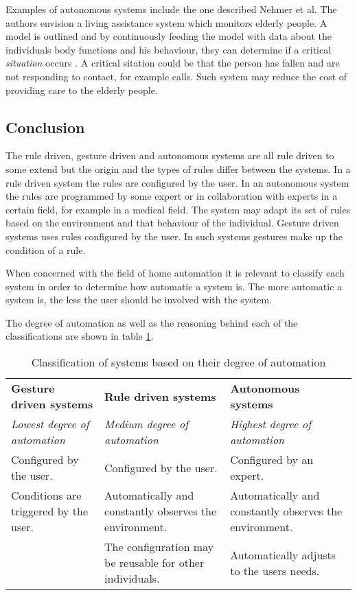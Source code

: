 Examples of autonomous systems include the one described Nehmer et al. The authors envision a living assistance system which monitors elderly people. A model is outlined and by continuously feeding the model with data about the individuals body functions and his behaviour, they can determine if a critical \textit{situation} occurs \cite{nehmer2006living}. A critical sitation could be that the person has fallen and are not responding to contact, for example calls.
Such system may reduce the cost of providing care to the elderly people.

\subsection{Conclusion}

The rule driven, gesture driven and autonomous systems are all rule driven to some extend but the origin and the types of rules differ between the systems. In a rule driven system the rules are configured by the user.
In an autonomous system the rules are programmed by some expert or in collaboration with experts in a certain field, for example in a medical field. The system may adapt its set of rules based on the environment and that behaviour of the individual.
Gesture driven systems uses rules configured by the user. In such systems gestures make up the condition of a rule.

When concerned with the field of home automation it is relevant to classify each system in order to determine how automatic a system is. The more automatic a system is, the less the user should be involved with the system.

The degree of automation as well as the reasoning behind each of the classifications are shown in table \ref{tbl:system-categories}.

\begin{table}[h]
\centering
\caption{Classification of systems based on their degree of automation}
\label{tbl:system-categories}
\begin{tabularx}{\textwidth}{XXX}
\textbf{Gesture driven systems} & \textbf{Rule driven systems} & \textbf{Autonomous systems} \\
\textit{Lowest degree of automation}
&
\textit{Medium degree of automation}
& 
\textit{Highest degree of automation}\\
Configured by the user.
&
Configured by the user.
& 
Configured by an expert.\\
Conditions are triggered by the user.
&
Automatically and constantly observes the environment.
&
Automatically and constantly observes the environment.\\
~
&
The configuration may be reusable for other individuals.
&
Automatically adjusts to the users needs.\\
\end{tabularx}
\end{table}

